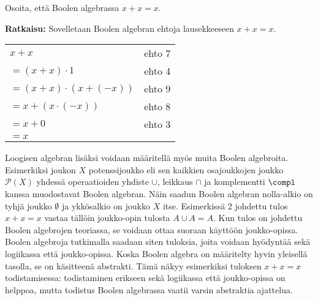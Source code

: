 \begin{esimerkki}
Osoita, että Boolen algebrassa $x + x = x$.


{\bf Ratkaisu:}
Sovelletaan Boolen algebran ehtoja lausekkeeseen $x + x = x$.

\begin{tabular}{ll}
$x + x$ & ehto 7 \\
$= (x + x) \cdot 1$ & ehto 4 \\
$= (x + x) \cdot (x + (-x))$ & ehto 9 \\
$= x + (x \cdot (-x))$ & ehto 8 \\
$= x + 0$ & ehto 3 \\
$= x$
\end{tabular}
\end{esimerkki}

Loogisen algebran lisäksi voidaan määritellä myös muita Boolen algebroita. Esimerkiksi joukon $X$ potenssijoukko eli sen kaikkien osajoukkojen joukko $\mathcal{P}(X)$ yhdessä operaatioiden yhdiste $\cup$, leikkaus $\cap$  ja komplementti $\compl$ kanssa muodostavat Boolen algebran. Näin saadun Boolen algebran nolla-alkio on tyhjä joukko $\emptyset$ ja ykkösalkio on joukko $X$ itse. Esimerkissä 2 johdettu tulos $x + x = x$ vastaa tällöin joukko-opin tulosta $A\cup A=A$. Kun tulos on johdettu Boolen algebrojen teoriassa, se voidaan ottaa suoraan käyttöön joukko-opissa. Boolen algebroja tutkimalla saadaan siten tuloksia, joita voidaan hyödyntää sekä logiikassa että joukko-opissa. Koska Boolen algebra on määritelty hyvin yleisellä tasolla, se on käsitteenä abstrakti. Tämä näkyy esimerkiksi tuloksen $x + x = x$ todistamisessa: todistaminen erikseen sekä logiikassa että joukko-opissa on helppoa, mutta todistus Boolen algebrassa vaatii varsin abstraktia ajattelua.



\Harjoitustehtavat

